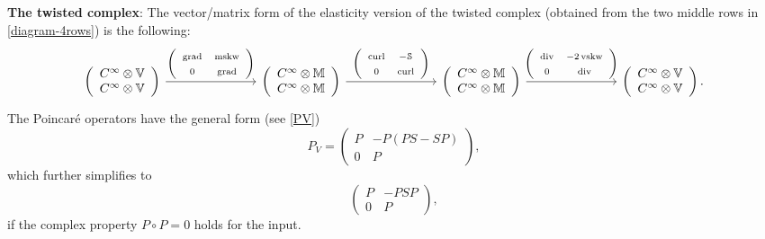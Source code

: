 \documentclass[11pt]{amsart}
\newcommand{\0}{\mathaccent23}
\newcommand\vskw{\operatorname{vskw}}
\newcommand\mskw{\operatorname{mskw}}
\newcommand\grad{\operatorname{grad}}
\renewcommand\div{\operatorname{div}}
\newcommand\curl{\operatorname{curl}}
\begin{document}
 \textbf{The twisted complex}: The vector/matrix form of the elasticity version of the twisted
 complex (obtained from the two middle rows in \eqref{diagram-4rows})
 is the following:
  \begin{equation} \label{twisted-elasticity}
\begin{tikzcd}[ampersand replacement=\&, column sep=1in]
\left (
\begin{array}{c}
{C^{\infty}\otimes \mathbb{V}}\\
{C^{\infty}\otimes \mathbb{V}}
\end{array}
\right ) \arrow{r}{\left (
\begin{array}{cc}
\grad & \mskw\\
0&\grad
\end{array}
\right ) } \&\left (
\begin{array}{c}
{C^{\infty}\otimes \mathbb{M}}\\
{C^{\infty}\otimes \mathbb{M}} 
\end{array}
\right )
\arrow{r}{\left (
\begin{array}{cc}
\curl & -\mathcal{S}\\
0&\curl
\end{array}
\right ) } \&\left (
\begin{array}{c}
{C^{\infty}\otimes \mathbb{M}}  \\
{C^{\infty}\otimes \mathbb{M}} 
\end{array}
\right )\arrow{r}{\left (
\begin{array}{cc}
\div & -2\vskw\\
0&\div
\end{array}
\right ) } \&\left (
\begin{array}{c}
{C^{\infty}\otimes \mathbb{V}}  \\
{C^{\infty}\otimes \mathbb{V}} 
\end{array}
\right ).
 \end{tikzcd}
\end{equation}
The Poincar\'e operators have the general form (see \eqref{PV})
$$
P_{V}=\left (
\begin{array}{cc}
P &-P(PS-SP)\\
0 & P
\end{array}
\right), 
$$
which further simplifies to 
$$
\left (
\begin{array}{cc}
P & -PSP\\
0 & P
\end{array}
\right),
$$
if the complex property $P\circ P=0$ holds for the input. 
\end{document}
